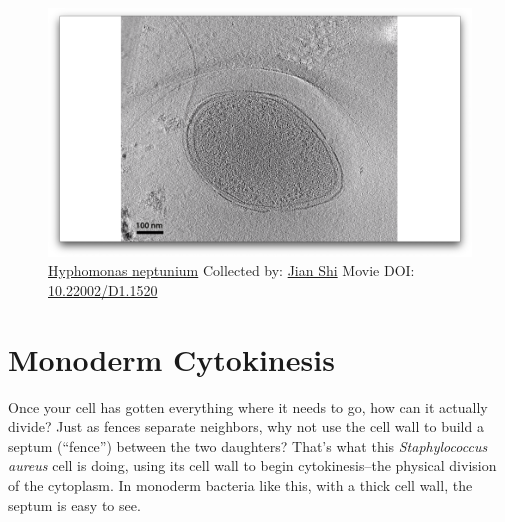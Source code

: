 \documentclass[]{tufte-book}
\begin{document}
\begin{figure}
\includegraphics{movie_stills/5_3b} \caption[\protect\hyperlink{tree}{Hyphomonas neptunium} Collected by:
\protect\hyperlink{jian_shi}{Jian Shi} Movie DOI:
\href{https://doi.org/10.22002/D1.1520}{10.22002/D1.1520}]{\protect\hyperlink{tree}{Hyphomonas neptunium} Collected by:
\protect\hyperlink{jian_shi}{Jian Shi} Movie DOI:
\href{https://doi.org/10.22002/D1.1520}{10.22002/D1.1520}}\label{fig:5-3b}
\end{figure}

\section{Monoderm Cytokinesis}\label{monoderm-cytokinesis}

Once your cell has gotten everything where it needs to go, how can it
actually divide? Just as fences separate neighbors, why not use the cell
wall to build a septum (``fence'') between the two daughters? That's
what this \emph{Staphylococcus aureus} cell is doing, using its cell
wall to begin cytokinesis--the physical division of the cytoplasm. In
monoderm bacteria like this, with a thick cell wall, the septum is easy
to see.
\end{document}
